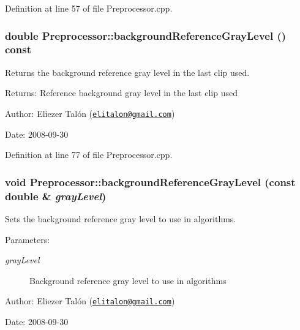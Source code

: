 Definition at line 57 of file Preprocessor.cpp.\hypertarget{class_preprocessor_159a9059fc811585eb9363e76ad16148}{
\subsubsection[backgroundReferenceGrayLevel]{\setlength{\rightskip}{0pt plus 5cm}double Preprocessor::backgroundReferenceGrayLevel () const}}
\label{class_preprocessor_159a9059fc811585eb9363e76ad16148}


Returns the background reference gray level in the last clip used. 

\begin{Desc}
\item[Returns:]Reference background gray level in the last clip used\end{Desc}
\begin{Desc}
\item[Author:]Eliezer Talón (\href{mailto:elitalon@gmail.com}{\tt elitalon@gmail.com}) \end{Desc}
\begin{Desc}
\item[Date:]2008-09-30 \end{Desc}


Definition at line 77 of file Preprocessor.cpp.\hypertarget{class_preprocessor_df20888f57b15f02ae0d7df536d97ef4}{
\subsubsection[backgroundReferenceGrayLevel]{\setlength{\rightskip}{0pt plus 5cm}void Preprocessor::backgroundReferenceGrayLevel (const double \& {\em grayLevel})}}
\label{class_preprocessor_df20888f57b15f02ae0d7df536d97ef4}


Sets the background reference gray level to use in algorithms. 

\begin{Desc}
\item[Parameters:]
\begin{description}
\item[{\em grayLevel}]Background reference gray level to use in algorithms\end{description}
\end{Desc}
\begin{Desc}
\item[Author:]Eliezer Talón (\href{mailto:elitalon@gmail.com}{\tt elitalon@gmail.com}) \end{Desc}
\begin{Desc}
\item[Date:]2008-09-30 \end{Desc}



